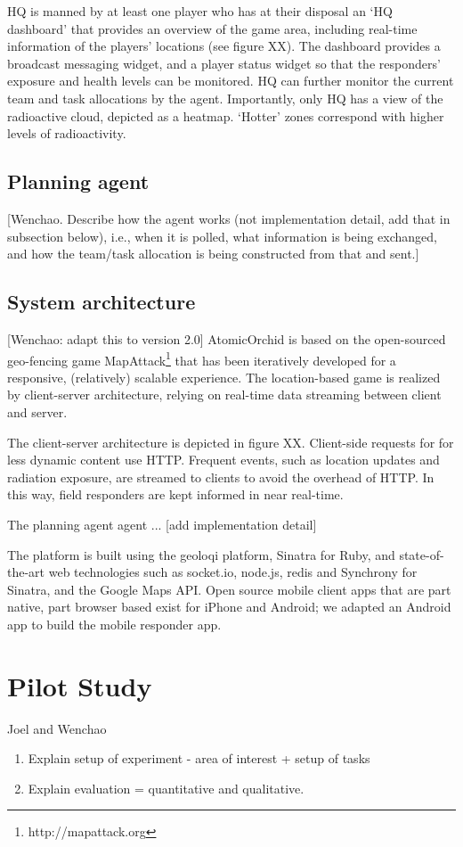 \documentclass{aamas2014}
\begin{document}
HQ is manned by at least one player who has at their disposal an `HQ dashboard' that provides an overview of the game area, including real-time information of the players' locations (see figure XX). The dashboard provides a broadcast messaging widget, and a player status widget so that the responders' exposure and health levels can be monitored. HQ can further monitor the   current team and task allocations by the agent. Importantly, only HQ has a view of the radioactive cloud, depicted as a heatmap. `Hotter' zones correspond with higher levels of radioactivity.

\subsection{Planning agent}
[Wenchao. Describe how the agent works (not implementation detail, add that in subsection below), i.e., when it is polled, what information is being exchanged, and how the team/task allocation is being constructed from that and sent.]

\subsection{System architecture}
[Wenchao: adapt this to version 2.0] AtomicOrchid is based on the open-sourced geo-fencing game MapAttack\footnote{http://mapattack.org} that has been iteratively developed for a responsive, (relatively) scalable experience.  The location-based game is realized by client-server architecture, relying on real-time data streaming between client and server.

The client-server architecture is depicted in figure XX. Client-side requests for for less dynamic content use HTTP. Frequent events, such as location updates and radiation exposure, are streamed to clients to avoid the overhead of HTTP. In this way, field responders are kept informed in near real-time.

The planning agent agent ... [add implementation detail]

The platform is built using the geoloqi platform, Sinatra for Ruby, and state-of-the-art web technologies such as socket.io, node.js, redis and Synchrony for Sinatra, and the Google Maps API. Open source mobile client apps that are part native, part browser based exist for iPhone and Android; we adapted an Android app to build the mobile responder app.

\section{Pilot Study}
Joel and Wenchao
\begin{enumerate}
\item Explain setup of experiment - area of interest + setup of tasks
\item Explain evaluation = quantitative and qualitative.
\end{enumerate}
\end{document}
